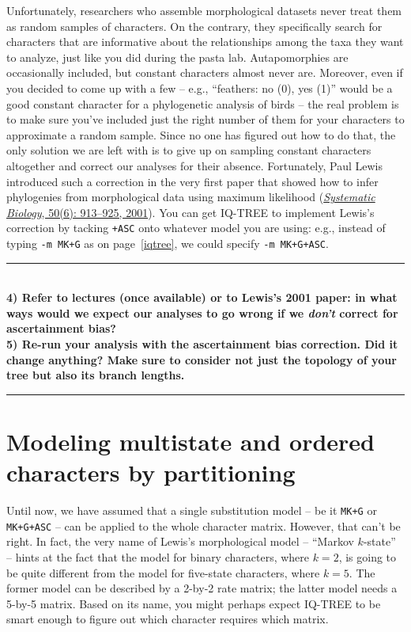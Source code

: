 \documentclass[12pt]{article}
\begin{document}
\noindent Unfortunately, researchers who assemble morphological datasets never treat them as random samples of characters. On the contrary, they specifically search for characters that are informative about the relationships among the taxa they want to analyze, just like you did during the pasta lab. Autapomorphies are occasionally included, but constant characters almost never are. Moreover, even if you decided to come up with a few -- e.g., ``feathers: no (0), yes (1)'' would be a good constant character for a phylogenetic analysis of birds -- the real problem is to make sure you've included just the right number of them for your characters to approximate a random sample. Since no one has figured out how to do that, the only solution we are left with is to give up on sampling constant characters altogether and correct our analyses for their absence. Fortunately, Paul Lewis introduced such a correction in the very first paper that showed how to infer phylogenies from morphological data using maximum likelihood (\href{https://academic.oup.com/sysbio/article/50/6/913/1628902}{\textit{Systematic Biology}, 50(6): 913--925, 2001}). You can get IQ-TREE to implement Lewis's correction by tacking \texttt{+ASC} onto whatever model you are using: e.g., instead of typing \texttt{-m MK+G} as on page~\ref{iqtree}, we could specify \texttt{-m MK+G+ASC}. \\

\hrule
\ \\[1ex]
\textbf{4) Refer to lectures (once available) or to Lewis's 2001 paper: in what ways would we expect our analyses to go wrong if we \textit{don't} correct for ascertainment bias?} \\

\noindent\textbf{5) Re-run your analysis with the ascertainment bias correction. Did it change anything? Make sure to consider not just the topology of your tree but also its branch lengths.} \\
\hrule

\section*{Modeling multistate and ordered characters by partitioning}

Until now, we have assumed that a single substitution model -- be it \texttt{MK+G} or \texttt{MK+G+ASC} -- can be applied to the whole character matrix. However, that can't be right. In fact, the very name of Lewis's morphological model -- ``Markov $k$-state'' -- hints at the fact that the model for binary characters, where $k = 2$, is going to be quite different from the model for five-state characters, where $k = 5$. The former model can be described by a 2-by-2 rate matrix; the latter model needs a 5-by-5 matrix. Based on its name, you might perhaps expect IQ-TREE to be smart enough to figure out which character requires which matrix. \\
\end{document}
